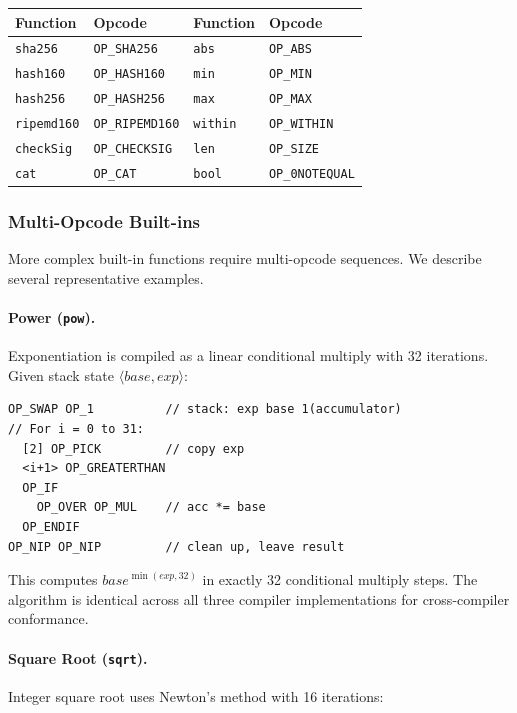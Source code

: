 \documentclass[11pt,a4paper]{article}
\newcommand{\op}[1]{\texttt{OP\_#1}}
\begin{document}
\begin{center}
\small
\begin{tabular}{@{}ll@{\qquad}ll@{}}
\toprule
\textbf{Function} & \textbf{Opcode} & \textbf{Function} & \textbf{Opcode} \\
\midrule
\texttt{sha256} & \op{SHA256} & \texttt{abs} & \op{ABS} \\
\texttt{hash160} & \op{HASH160} & \texttt{min} & \op{MIN} \\
\texttt{hash256} & \op{HASH256} & \texttt{max} & \op{MAX} \\
\texttt{ripemd160} & \op{RIPEMD160} & \texttt{within} & \op{WITHIN} \\
\texttt{checkSig} & \op{CHECKSIG} & \texttt{len} & \op{SIZE} \\
\texttt{cat} & \op{CAT} & \texttt{bool} & \op{0NOTEQUAL} \\
\bottomrule
\end{tabular}
\end{center}

\subsubsection{Multi-Opcode Built-ins}

More complex built-in functions require multi-opcode sequences.
We describe several representative examples.

\paragraph{Power (\texttt{pow}).}
Exponentiation is compiled as a linear conditional multiply with 32
iterations. Given stack state $\langle \textit{base}, \textit{exp} \rangle$:

\begin{lstlisting}[style=script]
OP_SWAP OP_1          // stack: exp base 1(accumulator)
// For i = 0 to 31:
  [2] OP_PICK         // copy exp
  <i+1> OP_GREATERTHAN
  OP_IF
    OP_OVER OP_MUL    // acc *= base
  OP_ENDIF
OP_NIP OP_NIP         // clean up, leave result
\end{lstlisting}

This computes $\textit{base}^{\min(\textit{exp}, 32)}$ in exactly 32
conditional multiply steps. The algorithm is identical across all three
compiler implementations for cross-compiler conformance.

\paragraph{Square Root (\texttt{sqrt}).}
Integer square root uses Newton's method with 16 iterations:
\end{document}
